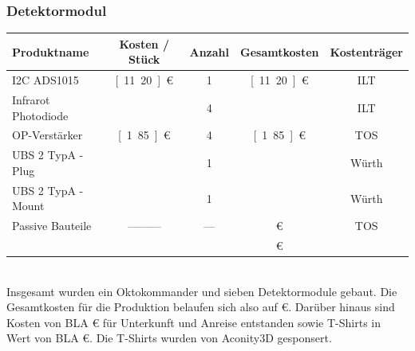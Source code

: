 \subsubsection*{Detektormodul} 
\begin{tabularx}{\textwidth}{p{4.5cm} | c c c c}
	Produktname 			& Kosten / Stück	& Anzahl & Gesamtkosten    	& Kostenträger \\ 
	\hline
	I2C ADS1015				& \unit[11.20]{€}   &   1    & \unit[11.20]{€}	& ILT    \\ [2mm]
	Infrarot Photodiode 	&					&   4    &                 	& ILT	 \\ [8mm]
	OP-Verstärker    		& \unit[1.85]{€}    &	4    & \unit[1.85]{€}  	& TOS    \\ [2mm]
	UBS 2 TypA -Plug		&                   &   1    &                 	& Würth  \\ [2mm]
	UBS 2 TypA -Mount		&                   &   1    &                 	& Würth  \\ [2mm]
	Passive Bauteile    	&	---------       &  ---	 & \unit[1]{€}	   	& TOS    \\ [2mm]
	\hline
							&					&		 & \unit[20]{€}		&		
\end{tabularx} \\

\noindent
Insgesamt wurden ein Oktokommander und sieben Detektormodule gebaut. Die Gesamtkosten für die Produktion belaufen sich also auf \unit[200]{€}. Darüber hinaus sind Kosten von BLA \euro{} für Unterkunft und Anreise entstanden sowie T-Shirts in Wert von BLA \euro{}. Die T-Shirts wurden von Aconity3D gesponsert.
